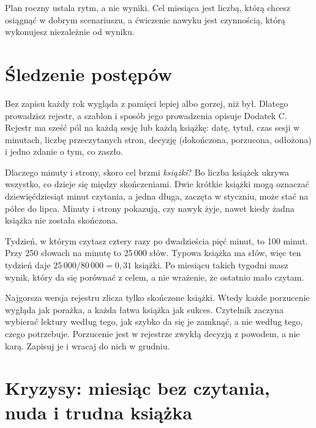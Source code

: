 \begin{zasada}
Plan roczny ustala rytm, a nie wyniki. Cel miesiąca jest liczbą, którą chcesz osiągnąć w dobrym scenariuszu, a ćwiczenie nawyku jest czynnością, którą wykonujesz niezależnie od wyniku.
\end{zasada}

\section{Śledzenie postępów}

Bez zapisu każdy rok wygląda z pamięci lepiej albo gorzej, niż był. Dlatego prowadzisz rejestr, a szablon i sposób jego prowadzenia opisuje Dodatek C. Rejestr ma sześć pól na każdą sesję lub każdą książkę: datę, tytuł, czas sesji w minutach, liczbę przeczytanych stron, decyzję (\glqq dokończona\grqq{}, \glqq porzucona\grqq{}, \glqq odłożona\grqq{}) i jedno zdanie o tym, co zaszło.

Dlaczego minuty i strony, skoro cel brzmi \emph{książki}? Bo liczba książek ukrywa wszystko, co dzieje się między skończeniami. Dwie krótkie książki mogą oznaczać dziewięćdziesiąt minut czytania, a jedna długa, zaczęta w styczniu, może stać na półce do lipca. Minuty i strony pokazują, czy nawyk żyje, nawet kiedy żadna książka nie została skończona.

\begin{przyklad}
Tydzień, w którym czytasz cztery razy po dwadzieścia pięć minut, to 100 minut. Przy 250 słowach na minutę to 25\,000 słów. Typowa książka ma  słów, więc ten tydzień daje $25\,000 / 80\,000 = 0{,}31$ książki. Po miesiącu takich tygodni masz wynik, który da się porównać z celem, a nie wrażenie, że \glqq ostatnio mało czytam\grqq{}.
\end{przyklad}

\begin{falle}[Pułapka]
Najgorsza wersja rejestru zlicza tylko skończone książki. Wtedy każde porzucenie wygląda jak porażka, a każda łatwa książka jak sukces. Czytelnik zaczyna wybierać lektury według tego, jak szybko da się je zamknąć, a nie według tego, czego potrzebuje. Porzucenie jest w rejestrze zwykłą decyzją z powodem, a nie karą. Zapisuj je i wracaj do nich w grudniu.
\end{falle}

\section{Kryzysy: miesiąc bez czytania, nuda i trudna książka}

